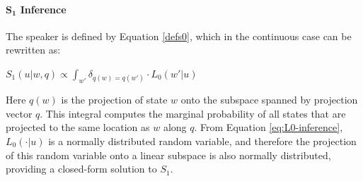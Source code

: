 \documentclass[9pt,twocolumn,twoside,lineno]{pnas-new}
\begin{document}
{	%








\paragraph{$\mathbf{S_1}$ Inference}
		The speaker is defined by Equation \ref{defs0}, which in the continuous case can be rewritten as:
		\begin{examples}
		\item $S_1(u\vert w,q) \propto \int_{w'} \delta_{q(w)=q(w')} \cdot L_0(w'\vert u)$
		\end{examples}
		Here $q(w)$ is the projection of state $w$ onto the subspace spanned by projection vector $q$. This integral computes the marginal probability of all states that are projected to the same location as $w$ along $q$. From Equation \ref{eq:L0-inference}, $L_0(\cdot \vert u)$ is a normally distributed random variable, and therefore the projection of this random variable onto a linear subspace is also normally distributed, providing a closed-form solution to $S_1$.




}
\end{document}
